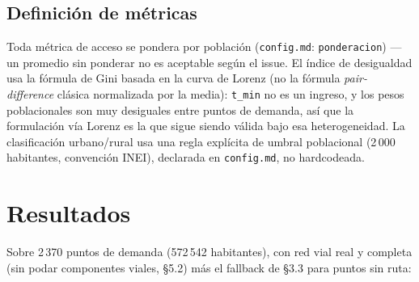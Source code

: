 \documentclass[11pt]{article}
\begin{document}
\subsection{Definición de métricas}

Toda métrica de acceso se pondera por población (\texttt{config.md}:
\texttt{ponderacion}) --- un promedio sin ponderar no es aceptable según el
issue. El índice de desigualdad usa la fórmula de Gini basada en la curva
de Lorenz (no la fórmula \emph{pair-difference} clásica normalizada por la
media): \texttt{t\_min} no es un ingreso, y los pesos poblacionales son muy
desiguales entre puntos de demanda, así que la formulación vía Lorenz es la
que sigue siendo válida bajo esa heterogeneidad. La clasificación
urbano/rural usa una regla explícita de umbral poblacional (2\,000
habitantes, convención INEI), declarada en \texttt{config.md}, no
hardcodeada.

\section{Resultados}

Sobre 2\,370 puntos de demanda (572\,542 habitantes), con red vial real y
completa (sin podar componentes viales, \S5.2) más el fallback de \S3.3
para puntos sin ruta:
\end{document}

